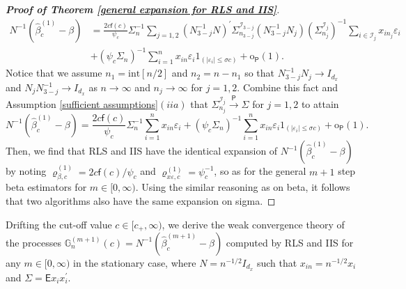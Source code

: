 \documentclass[11pt, letterpaper]{article}
\numberwithin{algorithm}{section}
\numberwithin{assumption}{section}
\numberwithin{lemma}{section}
\numberwithin{theorem}{section}
\numberwithin{corollary}{section}
\numberwithin{remark}{section}
\numberwithin{equation}{section}
\numberwithin{figure}{section}
\numberwithin{table}{section}
\begin{document}
\begin{proof}[\textnormal{\textbf{Proof of Theorem \ref{general expansion for RLS and IIS}}}]
\begin{align*}
N^{-1} (\widehat{\beta}_{c}^{(1)} - \beta) & = \frac{2 c \mathsf{f}(c)}{\psi_{c}} \Sigma_{n}^{-1} \sum_{j = 1, 2} (N_{3 - j}^{-1} N)^{\prime} \Sigma_{n_{3 - j}}^{\mathcal{I}_{3 - j}} (N_{3 - j}^{-1} N_{j}) (\Sigma_{n_{j}}^{\mathcal{I}_{j}})^{-1} \sum_{i \in \mathcal{I}_{j}} x_{in_{j}} \varepsilon_{i} \\
& + (\psi_{c} \Sigma_{n})^{-1} \sum_{i = 1}^{n} x_{in} \varepsilon_{i} 1_{(|\varepsilon_{i}| \le \sigma c)} + \mathrm{o}_{\mathsf{P}}(1).
\end{align*}
Notice that we assume $n_{1} = \mathrm{int}[n / 2]$ and $n_{2} = n - n_{1}$ so that $N_{3 - j}^{-1} N_{j} \to I_{d_{x}}$ and $N_{j} N_{3 - j}^{-1} \to I_{d_{x}}$ as $n \to \infty$ and $n_{j} \to \infty$ for $j = 1, 2$. Combine this fact and Assumption \ref{sufficient assumptions}$(iia)$ that $\Sigma_{n_{j}}^{\mathcal{I}_{j}} \overset{\mathsf{P}}{\to} \Sigma$ for $j = 1, 2$ to attain
\begin{equation*}
N^{-1} (\widehat{\beta}_{c}^{(1)} - \beta) = \frac{2 c \mathsf{f}(c)}{\psi_{c}} \Sigma_{n}^{-1} \sum_{i = 1}^{n} x_{in} \varepsilon_{i} + (\psi_{c} \Sigma_{n})^{-1} \sum_{i = 1}^{n} x_{in} \varepsilon_{i} 1_{(|\varepsilon_{i}| \le \sigma c)} + \mathrm{o}_{\mathsf{P}}(1).
\end{equation*}
Then, we find that RLS and IIS have the identical expansion of $N^{-1} (\widehat{\beta}_{c}^{(1)} - \beta)$ by noting $\varrho_{\beta, c}^{(1)} = 2 c \mathsf{f}(c) / \psi_{c}$ and $\varrho_{x \varepsilon, c}^{(1)} = \psi_{c}^{-1}$, so as for the general $m + 1$ step beta estimators for $m \in [0, \infty)$. Using the similar reasoning as on beta, it follows that two algorithms also have the same expansion on sigma.
\end{proof}

Drifting the cut-off value $c \in [c_{+}, \infty)$, we derive the weak convergence theory of the processes $\mathbb{G}_{n}^{(m + 1)}(c) = N^{-1} (\widehat{\beta}_{c}^{(m + 1)} - \beta)$ computed by RLS and IIS for any $m \in [0, \infty)$ in the stationary case, where $N = n^{-1/2} I_{d_{x}}$ such that $x_{in} = n^{-1/2} x_{i}$ and $\Sigma = \mathsf{E} x_{i} x_{i}^{\prime}$.
\end{document}
